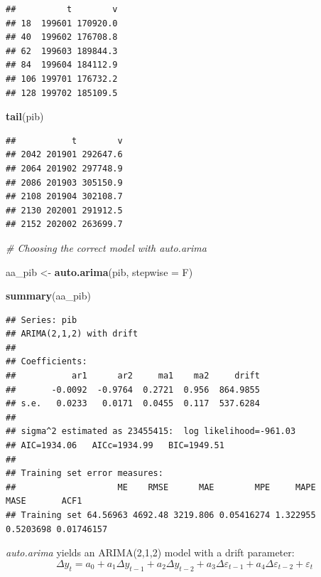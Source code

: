 \documentclass[
]{article}
\newenvironment{Shaded}{\begin{snugshade}}{\end{snugshade}}
\newcommand{\CommentTok}[1]{\textcolor[rgb]{0.56,0.35,0.01}{\textit{#1}}}
\newcommand{\DataTypeTok}[1]{\textcolor[rgb]{0.13,0.29,0.53}{#1}}
\newcommand{\KeywordTok}[1]{\textcolor[rgb]{0.13,0.29,0.53}{\textbf{#1}}}
\newcommand{\NormalTok}[1]{#1}
\newcommand{\OperatorTok}[1]{\textcolor[rgb]{0.81,0.36,0.00}{\textbf{#1}}}
\newcommand{\StringTok}[1]{\textcolor[rgb]{0.31,0.60,0.02}{#1}}
\begin{document}
\begin{verbatim}
##          t        v
## 18  199601 170920.0
## 40  199602 176708.8
## 62  199603 189844.3
## 84  199604 184112.9
## 106 199701 176732.2
## 128 199702 185109.5
\end{verbatim}

\begin{Shaded}
\begin{Highlighting}[]
\KeywordTok{tail}\NormalTok{(pib)}
\end{Highlighting}
\end{Shaded}

\begin{verbatim}
##           t        v
## 2042 201901 292647.6
## 2064 201902 297748.9
## 2086 201903 305150.9
## 2108 201904 302108.7
## 2130 202001 291912.5
## 2152 202002 263699.7
\end{verbatim}

\begin{Shaded}
\end{Shaded}

\begin{Shaded}
\begin{Highlighting}[]
\CommentTok{# Choosing the correct model with auto.arima}

\NormalTok{aa_pib <-}\StringTok{ }\KeywordTok{auto.arima}\NormalTok{(pib, }\DataTypeTok{stepwise =}\NormalTok{ F)}

\KeywordTok{summary}\NormalTok{(aa_pib)}
\end{Highlighting}
\end{Shaded}

\begin{verbatim}
## Series: pib 
## ARIMA(2,1,2) with drift 
## 
## Coefficients:
##           ar1      ar2     ma1    ma2     drift
##       -0.0092  -0.9764  0.2721  0.956  864.9855
## s.e.   0.0233   0.0171  0.0455  0.117  537.6284
## 
## sigma^2 estimated as 23455415:  log likelihood=-961.03
## AIC=1934.06   AICc=1934.99   BIC=1949.51
## 
## Training set error measures:
##                    ME    RMSE      MAE        MPE     MAPE      MASE       ACF1
## Training set 64.56963 4692.48 3219.806 0.05416274 1.322955 0.5203698 0.01746157
\end{verbatim}

\emph{auto.arima} yields an ARIMA(2,1,2) model with a drift parameter:
\[ \Delta y_t = a_0 + a_1 \Delta y_{t-1} + a_2 \Delta y_{t-2} + a_3 \Delta \varepsilon_{t-1} + a_4 \Delta \varepsilon_{t-2} +\varepsilon_t \]
\end{document}
